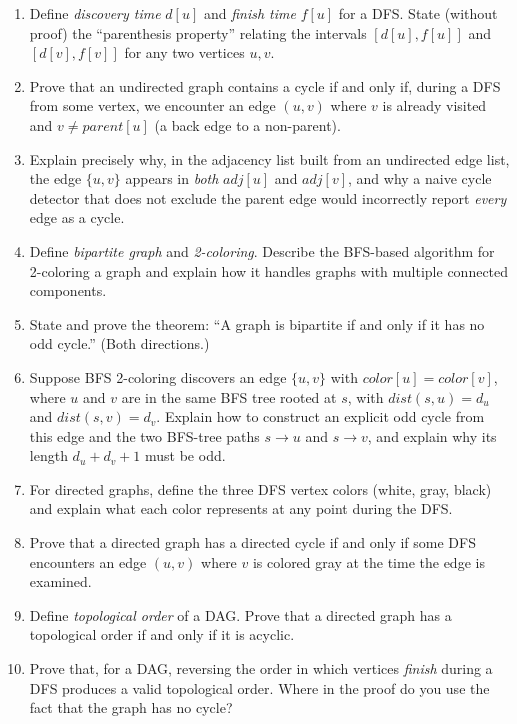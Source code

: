 \documentclass[11pt]{article}
\begin{document}
\begin{enumerate}[label=\textbf{A\arabic*.}, leftmargin=2.2em]
\item Define \emph{discovery time} $d[u]$ and \emph{finish time} $f[u]$ for a DFS.
State (without proof) the ``parenthesis property'' relating the intervals $[d[u], f[u]]$
and $[d[v], f[v]]$ for any two vertices $u, v$.

\item Prove that an undirected graph contains a cycle if and only if, during a DFS from
some vertex, we encounter an edge $(u,v)$ where $v$ is already visited and $v \ne
parent[u]$ (a back edge to a non-parent).

\item Explain precisely why, in the adjacency list built from an undirected edge list,
the edge $\{u,v\}$ appears in \emph{both} $adj[u]$ and $adj[v]$, and why a naive cycle
detector that does not exclude the parent edge would incorrectly report \emph{every} edge
as a cycle.

\item Define \emph{bipartite graph} and \emph{2-coloring}. Describe the BFS-based
algorithm for 2-coloring a graph and explain how it handles graphs with multiple
connected components.

\item State and prove the theorem: ``A graph is bipartite if and only if it has no odd
cycle.'' (Both directions.)

\item Suppose BFS 2-coloring discovers an edge $\{u,v\}$ with $color[u] = color[v]$, where
$u$ and $v$ are in the same BFS tree rooted at $s$, with $dist(s,u) = d_u$ and
$dist(s,v)=d_v$. Explain how to construct an explicit odd cycle from this edge and the
two BFS-tree paths $s \to u$ and $s \to v$, and explain why its length $d_u + d_v + 1$
must be odd.

\item For directed graphs, define the three DFS vertex colors (white, gray, black) and
explain what each color represents at any point during the DFS.

\item Prove that a directed graph has a directed cycle if and only if some DFS encounters
an edge $(u,v)$ where $v$ is colored gray at the time the edge is examined.

\item Define \emph{topological order} of a DAG. Prove that a directed graph has a
topological order if and only if it is acyclic.

\item Prove that, for a DAG, reversing the order in which vertices \emph{finish} during a
DFS produces a valid topological order. Where in the proof do you use the fact that the
graph has no cycle?


\end{enumerate}
\end{document}
